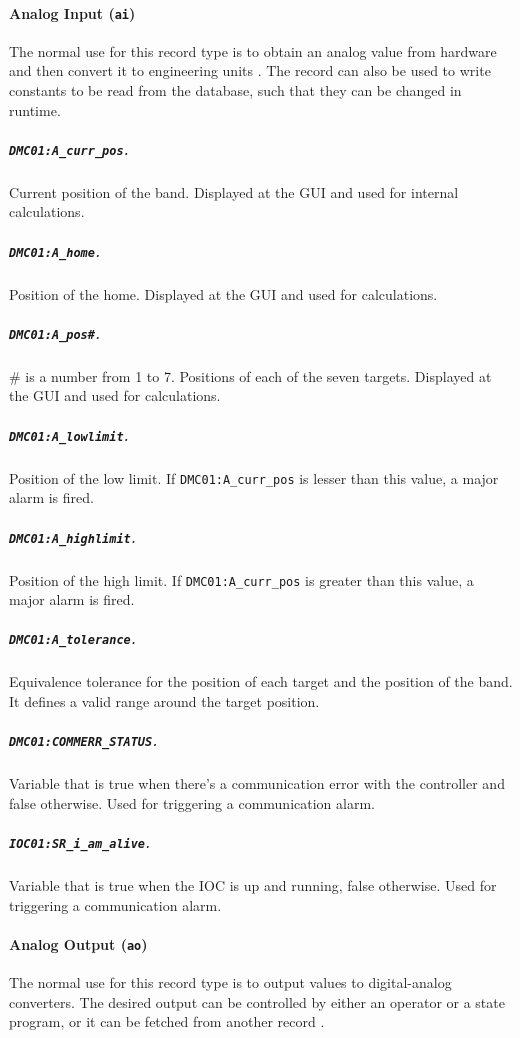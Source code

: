     \paragraph{Analog Input (\texttt{ai})}
        The normal use for this record type is to obtain an analog value from hardware and then convert it to engineering units \cite{stanley1998}.
        The record can also be used to write constants to be read from the database, such that they can be changed in runtime.

        \subparagraph{\texttt{DMC01:A\_curr\_pos}.}
            Current position of the band.
            Displayed at the GUI and used for internal calculations.

        \subparagraph{\texttt{DMC01:A\_home}.}
            Position of the home.
            Displayed at the GUI and used for calculations.

        \subparagraph{\texttt{DMC01:A\_pos\#}.}
            \# is a number from 1 to 7.
            Positions of each of the seven targets.
            Displayed at the GUI and used for calculations.

        \subparagraph{\texttt{DMC01:A\_lowlimit}.}
            Position of the low limit.
            If \texttt{DMC01:A\_curr\_pos} is lesser than this value, a major alarm is fired.

        \subparagraph{\texttt{DMC01:A\_highlimit}.}
            Position of the high limit.
            If \texttt{DMC01:A\_curr\_pos} is greater than this value, a major alarm is fired.

        \subparagraph{\texttt{DMC01:A\_tolerance}.}
            Equivalence tolerance for the position of each target and the position of the band.
            It defines a valid range around the target position.

        \subparagraph{\texttt{DMC01:COMMERR\_STATUS}.}
            Variable that is true when there's a communication error with the controller and false otherwise.
            Used for triggering a communication alarm.

        \subparagraph{\texttt{IOC01:SR\_i\_am\_alive}.}
            Variable that is true when the IOC is up and running, false otherwise.
            Used for triggering a communication alarm.

    \paragraph{Analog Output (\texttt{ao})}
        The normal use for this record type is to output values to digital-analog converters.
        The desired output can be controlled by either an operator or a state program, or it can be fetched from another record \cite{stanley1998}.

